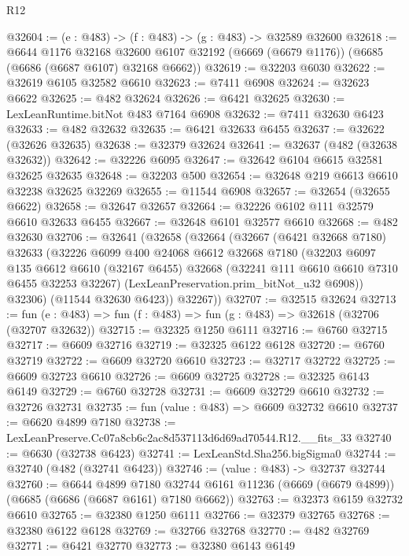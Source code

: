 \begin{lexlean}{R12}
\begin{coremodule}
@32604 := (e : @483) -> (f : @483) -> (g : @483) -> @32589 @32600
@32618 := @6644
    @1176
    @32168
    @32600
    @6107
    @32192
    (@6669 (@6679 @1176))
    (@6685 (@6686 (@6687 @6107) @32168 @6662))
@32619 := @32203 @6030
@32622 := @32619 @6105 @32582 @6610
@32623 := @7411 @6908
@32624 := @32623 @6622
@32625 := @482 @32624
@32626 := @6421 @32625
@32630 := LexLeanRuntime.bitNot @483 @7164 @6908
@32632 := @7411 @32630 @6423
@32633 := @482 @32632
@32635 := @6421 @32633 @6455
@32637 := @32622 (@32626 @32635)
@32638 := @32379 @32624
@32641 := @32637 (@482 (@32638 @32632))
@32642 := @32226 @6095
@32647 := @32642 @6104 @6615 @32581 @32625 @32635
@32648 := @32203 @500
@32654 := @32648 @219 @6613 @6610 @32238 @32625 @32269
@32655 := @11544 @6908
@32657 := @32654 (@32655 @6622)
@32658 := @32647 @32657
@32664 := @32226 @6102 @111 @32579 @6610 @32633 @6455
@32667 := @32648 @6101 @32577 @6610
@32668 := @482 @32630
@32706 := @32641
    (@32658
      (@32664
        (@32667
          (@6421 @32668 @7180)
          @32633
          (@32226
            @6099
            @400
            @24068
            @6612
            @32668
            @7180
            (@32203
              @6097
              @135
              @6612
              @6610
              (@32167 @6455)
              @32668
              (@32241 @111 @6610 @6610 @7310 @6455 @32253 @32267)
              (LexLeanPreservation.prim_bitNot_u32 @6908))
            @32306)
          (@11544 @32630 @6423))
        @32267))
@32707 := @32515 @32624
@32713 := fun (e : @483) => fun (f : @483) => fun (g : @483) => @32618 (@32706 (@32707 @32632))
@32715 := @32325 @1250 @6111
@32716 := @6760 @32715
@32717 := @6609 @32716
@32719 := @32325 @6122 @6128
@32720 := @6760 @32719
@32722 := @6609 @32720 @6610
@32723 := @32717 @32722
@32725 := @6609 @32723 @6610
@32726 := @6609 @32725
@32728 := @32325 @6143 @6149
@32729 := @6760 @32728
@32731 := @6609 @32729 @6610
@32732 := @32726 @32731
@32735 := fun (value : @483) => @6609 @32732 @6610
@32737 := @6620 @4899 @7180
@32738 := LexLeanPreserve.Cc07a8cb6c2ac8d537113d6d69ad70544.R12.__fits_33
@32740 := @6630 (@32738 @6423)
@32741 := LexLeanStd.Sha256.bigSigma0
@32744 := @32740 (@482 (@32741 @6423))
@32746 := (value : @483) -> @32737 @32744
@32760 := @6644
    @4899
    @7180
    @32744
    @6161
    @11236
    (@6669 (@6679 @4899))
    (@6685 (@6686 (@6687 @6161) @7180 @6662))
@32763 := @32373 @6159 @32732 @6610
@32765 := @32380 @1250 @6111
@32766 := @32379 @32765
@32768 := @32380 @6122 @6128
@32769 := @32766 @32768
@32770 := @482 @32769
@32771 := @6421 @32770
@32773 := @32380 @6143 @6149

\end{coremodule}
\end{lexlean}
